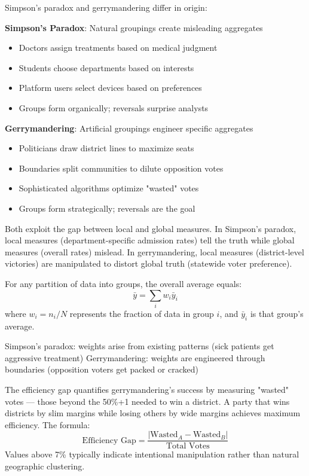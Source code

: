 Simpson's paradox and gerrymandering differ in origin:

\textbf{Simpson's Paradox}: Natural groupings create misleading aggregates
\begin{itemize}
\item Doctors assign treatments based on medical judgment
\item Students choose departments based on interests
\item Platform users select devices based on preferences
\item Groups form organically; reversals surprise analysts
\end{itemize}

\textbf{Gerrymandering}: Artificial groupings engineer specific aggregates
\begin{itemize}
\item Politicians draw district lines to maximize seats
\item Boundaries split communities to dilute opposition votes
\item Sophisticated algorithms optimize "wasted" votes
\item Groups form strategically; reversals are the goal
\end{itemize}

Both exploit the gap between local and global measures. In Simpson's paradox, local measures (department-specific admission rates) tell the truth while global measures (overall rates) mislead. In gerrymandering, local measures (district-level victories) are manipulated to distort global truth (statewide voter preference).

For any partition of data into groups, the overall average equals:
\[
\bar{y} = \sum_{i} w_i \bar{y}_i
\]
where $w_i = n_i/N$ represents the fraction of data in group $i$, and $\bar{y}_i$ is that group's average.

Simpson's paradox: weights arise from existing patterns (sick patients get aggressive treatment)
Gerrymandering: weights are engineered through boundaries (opposition voters get packed or cracked)

The efficiency gap quantifies gerrymandering's success by measuring "wasted" votes — those beyond the 50\%+1 needed to win a district. A party that wins districts by slim margins while losing others by wide margins achieves maximum efficiency. The formula:
\[
\text{Efficiency Gap} = \frac{|\text{Wasted}_A - \text{Wasted}_B|}{\text{Total Votes}}
\]
Values above 7\% typically indicate intentional manipulation rather than natural geographic clustering.

